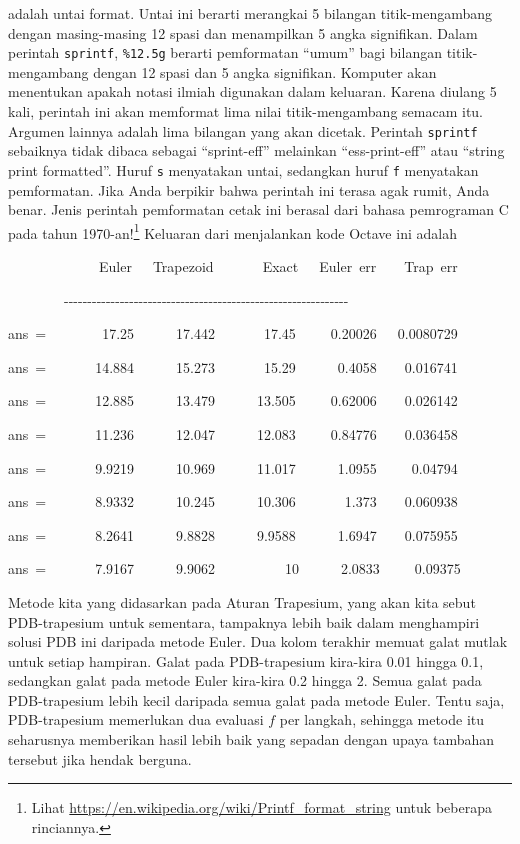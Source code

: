 \noindent adalah untai format. Untai ini berarti merangkai 5 bilangan
titik-mengambang dengan masing-masing 12 spasi dan menampilkan 5 angka
signifikan. Dalam perintah \texttt{sprintf}, \texttt{\%12.5g} berarti
pemformatan ``umum'' bagi bilangan titik-mengambang dengan 12 spasi
dan 5 angka signifikan. Komputer akan menentukan apakah notasi ilmiah
digunakan dalam keluaran. Karena diulang 5 kali, perintah ini akan
memformat lima nilai titik-mengambang semacam itu. Argumen lainnya
adalah lima bilangan yang akan dicetak. Perintah \texttt{sprintf}
sebaiknya tidak dibaca sebagai ``sprint-eff'' melainkan ``ess-print-eff''
atau ``string print formatted''. Huruf \texttt{s} menyatakan untai,
sedangkan huruf \texttt{f} menyatakan pemformatan. Jika Anda berpikir
bahwa perintah ini terasa agak rumit, Anda benar. Jenis perintah pemformatan
cetak ini berasal dari bahasa pemrograman C pada tahun 1970-an!\cprotect\footnote{Lihat \url{https://en.wikipedia.org/wiki/Printf_format_string} untuk
beberapa rinciannya.} Keluaran dari menjalankan kode Octave ini adalah
\begin{lyxcode}
~~~~~~~~~~~~~Euler~~~Trapezoid~~~~~~~Exact~~~Euler~err~~~~Trap~err

~~~~~~~~-{}-{}-{}-{}-{}-{}-{}-{}-{}-{}-{}-{}-{}-{}-{}-{}-{}-{}-{}-{}-{}-{}-{}-{}-{}-{}-{}-{}-{}-{}-{}-{}-{}-{}-{}-{}-{}-{}-{}-{}-{}-{}-{}-{}-{}-{}-{}-{}-{}-{}-{}-{}-{}-{}-{}-{}-{}-{}-{}-{}-

ans~=~~~~~~~~17.25~~~~~~17.442~~~~~~~17.45~~~~~0.20026~~~0.0080729

ans~=~~~~~~~14.884~~~~~~15.273~~~~~~~15.29~~~~~~0.4058~~~~0.016741

ans~=~~~~~~~12.885~~~~~~13.479~~~~~~13.505~~~~~0.62006~~~~0.026142

ans~=~~~~~~~11.236~~~~~~12.047~~~~~~12.083~~~~~0.84776~~~~0.036458

ans~=~~~~~~~9.9219~~~~~~10.969~~~~~~11.017~~~~~~1.0955~~~~~0.04794

ans~=~~~~~~~8.9332~~~~~~10.245~~~~~~10.306~~~~~~~1.373~~~~0.060938

ans~=~~~~~~~8.2641~~~~~~9.8828~~~~~~9.9588~~~~~~1.6947~~~~0.075955

ans~=~~~~~~~7.9167~~~~~~9.9062~~~~~~~~~~10~~~~~~2.0833~~~~~0.09375
\end{lyxcode}
Metode kita yang didasarkan pada Aturan Trapesium, yang akan kita
sebut PDB-trapesium untuk sementara, tampaknya lebih baik dalam menghampiri
solusi PDB ini daripada metode Euler. Dua kolom terakhir memuat galat
mutlak untuk setiap hampiran. Galat pada PDB-trapesium kira-kira 0.01
hingga 0.1, sedangkan galat pada metode Euler kira-kira 0.2 hingga
2. Semua galat pada PDB-trapesium lebih kecil daripada semua galat
pada metode Euler. Tentu saja, PDB-trapesium memerlukan dua evaluasi
$f$ per langkah, sehingga metode itu seharusnya memberikan hasil
lebih baik yang sepadan dengan upaya tambahan tersebut jika hendak
berguna.

